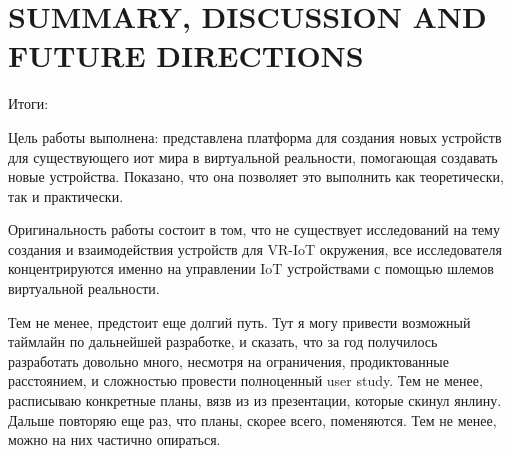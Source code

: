 
\chapter{SUMMARY, DISCUSSION AND FUTURE DIRECTIONS}

Итоги:

Цель работы выполнена: представлена платформа для создания новых устройств для существующего иот мира в виртуальной реальности, помогающая создавать новые устройства. Показано, что она позволяет это выполнить как теоретически, так и практически.

Оригинальность работы состоит в том, что не существует исследований на тему создания и взаимодействия устройств для VR-IoT окружения, все исследователя концентрируются именно на управлении IoT устройствами с помощью шлемов виртуальной реальности.

Тем не менее, предстоит еще долгий путь. Тут я могу привести возможный таймлайн по дальнейшей разработке, и сказать, что за год получилось разработать довольно много, несмотря на ограничения, продиктованные расстоянием, и сложностью провести полноценный user study. Тем не менее, расписываю конкретные планы, вязв из из презентации, которые скинул янлину. Дальше повторяю еще раз, что планы, скорее всего, поменяются. Тем не менее, можно на них частично опираться.





